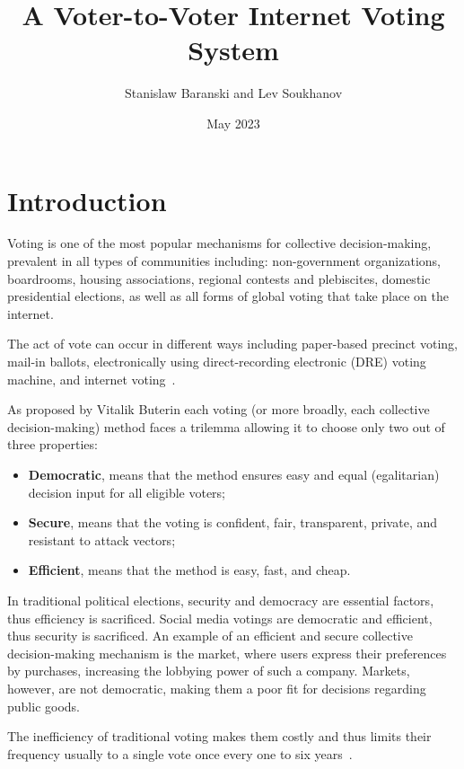 \documentclass{article}
\title{A Voter-to-Voter Internet Voting System}
\author{Stanislaw Baranski and Lev Soukhanov}
\date{May 2023}
\begin{document}
\maketitle

\section{Introduction}
Voting is one of the most popular mechanisms for collective decision-making, prevalent in all types of communities including: non-government organizations, boardrooms, housing associations, regional contests and plebiscites, domestic presidential elections, as well as all forms of global voting that take place on the internet.

The act of vote can occur in different ways including paper-based precinct voting, mail-in ballots, electronically using direct-recording electronic (DRE) voting machine, and internet voting~\cite{parkGoingBadWorse2021}.

As proposed by Vitalik Buterin\cite{buterinBlockchainVotingOverrated2021} each voting (or more broadly, each collective decision-making) method faces a trilemma allowing it to choose only two out of three properties:

\begin{itemize}
    \item \textbf{Democratic}, means that the method ensures easy and equal (egalitarian) decision input for all eligible voters;
    \item \textbf{Secure}, means that the voting is confident, fair, transparent, private, and resistant to attack vectors;
    \item \textbf{Efficient}, means that the method is easy, fast, and cheap.
\end{itemize}

In traditional political elections, security and democracy are essential factors, thus efficiency is sacrificed. Social media votings are democratic and efficient, thus security is sacrificed. An example of an efficient and secure collective decision-making mechanism is the market, where users express their preferences by purchases, increasing the lobbying power of such a company. Markets, however, are not democratic, making them a poor fit for decisions regarding public goods. 

The inefficiency of traditional voting makes them costly and thus limits their frequency usually to a single vote once every one to six years~\cite{buterinBlockchainVotingOverrated2021}.
\end{document}
